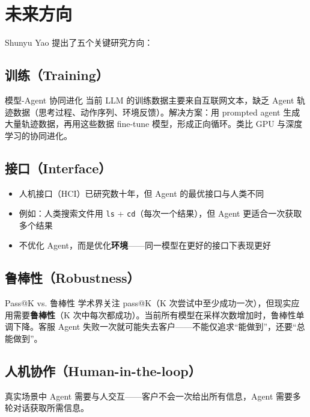 \section{未来方向}

Shunyu Yao 提出了五个关键研究方向：

\subsection{训练（Training）}

\begin{importantbox}{模型-Agent 协同进化}
当前 LLM 的训练数据主要来自互联网文本，缺乏 Agent 轨迹数据（思考过程、动作序列、环境反馈）。解决方案：用 prompted agent 生成大量轨迹数据，再用这些数据 fine-tune 模型，形成正向循环。类比 GPU 与深度学习的协同进化。
\end{importantbox}

\subsection{接口（Interface）}

\begin{itemize}
    \item 人机接口（HCI）已研究数十年，但 Agent 的最优接口与人类不同
    \item 例如：人类搜索文件用 \texttt{ls} + \texttt{cd}（每次一个结果），但 Agent 更适合一次获取多个结果
    \item 不优化 Agent，而是优化\textbf{环境}——同一模型在更好的接口下表现更好
\end{itemize}

\subsection{鲁棒性（Robustness）}

\begin{warningbox}{Pass@K vs. 鲁棒性}
学术界关注 pass@K（K 次尝试中至少成功一次），但现实应用需要\textbf{鲁棒性}（K 次中每次都成功）。当前所有模型在采样次数增加时，鲁棒性单调下降。客服 Agent 失败一次就可能失去客户——不能仅追求``能做到''，还要``总能做到''。
\end{warningbox}

\subsection{人机协作（Human-in-the-loop）}

真实场景中 Agent 需要与人交互——客户不会一次给出所有信息，Agent 需要多轮对话获取所需信息。

